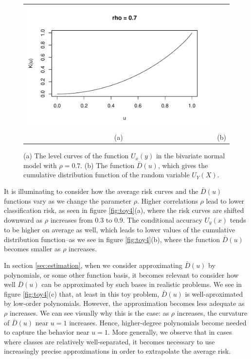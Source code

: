 \documentclass[12pt]{article}
\begin{document}
\begin{figure}[h]
\begin{tabular}{cc}
\includegraphics[scale = 0.65, clip = true, trim = 0 -0.3in 0 0.5in]{extrapolation_figures/illus_kfunc_0_7.pdf}\\
(a) & (b)
\end{tabular}

\caption{
(a) The level curves of the function $U_x(y)$ in the bivariate normal model with $\rho = 0.7$.
(b) The function $\bar{D}(u)$, which gives the cumulative distribution function of the random variable $U_Y(X)$.}\label{fig:toy3}
\end{figure}

It is illuminating to consider how the average risk curves and the
$\bar{D}(u)$ functions vary as we change the parameter $\rho$.  Higher
correlations $\rho$ lead to lower classification risk, as seen in
figure \ref{fig:toy4}(a), where the risk curves are shifted downward as
$\rho$ increases from 0.3 to 0.9.  The conditional accuracy $U_y(x)$
tends to be higher on average as well, which leads to lower values of
the cumulative distribution function--as we see in
figure \ref{fig:toy4}(b), where the function $\bar{D}(u)$ becomes smaller
as $\rho$ increases.

In section \ref{sec:estimation}, when we consider approximating
$\bar{D}(u)$ by polynomials, or some other function basis, it becomes
relevant to consider how well $\bar{D}(u)$ can be approximated by such
bases in realistic problems.  We see in figure \ref{fig:toy4}(c) that,
at least in this toy problem, $\bar{D}(u)$ is well-aproximated by
low-order polynomials.  However, the approximation becomes less
adequate as $\rho$ increases.  We can see visually why this is the
case: as $\rho$ increases, the curvature of $\bar{D}(u)$ near $u = 1$
increases.  Hence, higher-degree polynomials become needed to capture
the behavior near $u = 1$.  More generally, we observe that in cases
where classes are relatively well-separated, it becomes necessary to
use increasingly precise approximations in order to extrapolate the
average risk.
\end{document}
